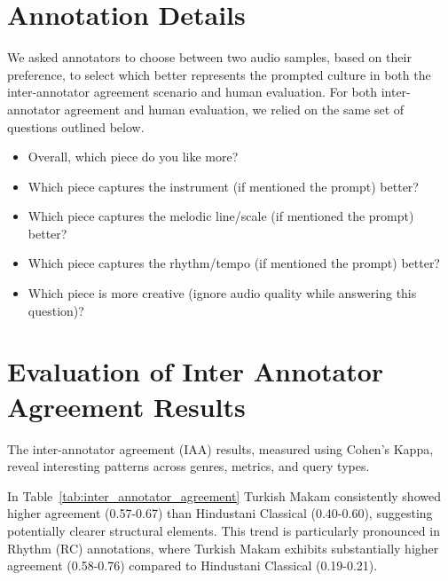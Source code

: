 \section{Annotation Details} \label{appendix:annotation_det}
We asked annotators to choose between two audio samples, based on their preference, to select which better represents the prompted culture in both the inter-annotator agreement scenario and human evaluation. For both inter-annotator agreement and human evaluation, we relied on the same set of questions outlined below.
\begin{itemize}
\setlength{\parskip}{0pt}
    \item Overall, which piece do you like more?
    \item Which piece captures the instrument (if mentioned the prompt) better?
    \item Which piece captures the melodic line/scale (if mentioned the prompt) better?
    \item Which piece captures the rhythm/tempo (if mentioned the prompt) better?
    \item Which piece is more creative (ignore audio quality while answering this question)?
\end{itemize}

\section{Evaluation of Inter Annotator Agreement Results} \label{appendix:iaa}

The inter-annotator agreement (IAA) results, measured using Cohen's Kappa, reveal interesting patterns across genres, metrics, and query types. 

In Table~\ref{tab:inter_annotator_agreement} Turkish Makam consistently showed higher agreement (0.57-0.67) than Hindustani Classical (0.40-0.60), suggesting potentially clearer structural elements. This trend is particularly pronounced in Rhythm (RC) annotations, where Turkish Makam exhibits substantially higher agreement (0.58-0.76) compared to Hindustani Classical (0.19-0.21).


